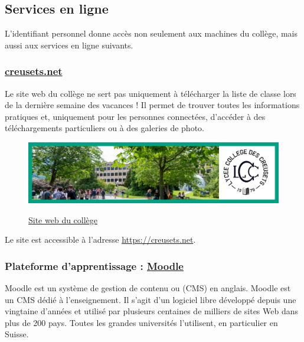 \documentclass[10pt,a4paper]{report}
\begin{document}
\subsection{Services en ligne}

L'identifiant personnel donne accès non seulement aux machines du collège, mais aussi aux services en ligne suivants.



\subsubsection{\href{creusets.net}{creusets.net}}

Le site web du collège ne sert pas uniquement à télécharger la liste de classe lors de la dernière semaine des vacances ! Il permet de trouver toutes les informations pratiques et, uniquement pour les personnes connectées, d'accéder à des téléchargements particuliers ou à des galeries de photo.

\begin{figure}[H]
	\centering
	\href{https://creusets.net}{
		\includegraphics[width=0.75\linewidth]{images/capture_creusets_20210811.png}
	}
	\caption{\protect \href{https://edu.vs.ch}{Site web du collège}}
	\label{fig:capturecreusets20210811}
\end{figure}

Le site est accessible à l'adresse \href{https://creusets.net}{https://creusets.net}.



\subsubsection{Plateforme d'apprentissage : \href{https://moodle-lcc.edu-ictvs.ch/}{Moodle}}

Moodle est un système de gestion de contenu ou  (CMS) en anglais. Moodle est un CMS dédié à l'enseignement. Il s'agit d'un logiciel libre développé depuis une vingtaine d'années et utilisé par plusieurs centaines de milliers de sites Web dans plus de 200 pays. Toutes les grandes universités l'utilisent, en particulier en Suisse.
\end{document}
